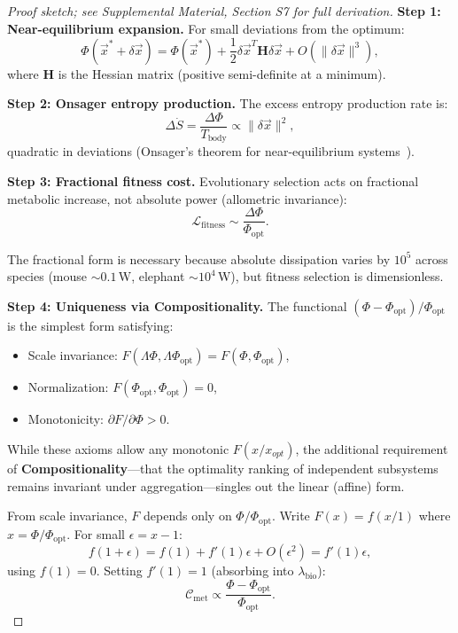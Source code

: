 \begin{proof}[Proof sketch; see Supplemental Material, Section S7 for full derivation]
\textbf{Step 1: Near-equilibrium expansion.} For small deviations from the
optimum:
\begin{equation}
    \Phi(\vec{x}^* + \delta\vec{x})
    = \Phi(\vec{x}^*)
    + \frac{1}{2} \delta\vec{x}^T \mathbf{H} \delta\vec{x} + O(\|\delta\vec{x}\|^3),
\end{equation}
where $\mathbf{H}$ is the Hessian matrix (positive semi-definite at a minimum).

\textbf{Step 2: Onsager entropy production.} The excess entropy production rate
is:
\begin{equation}
    \Delta\dot{S} = \frac{\Delta\Phi}{T_{\mathrm{body}}}
    \propto \|\delta\vec{x}\|^2,
\end{equation}
quadratic in deviations (Onsager's theorem for near-equilibrium
systems~\cite{onsager1931}).

\textbf{Step 3: Fractional fitness cost.} Evolutionary selection acts on
fractional metabolic increase, not absolute power (allometric invariance):
\begin{equation}
    \mathcal{L}_{\mathrm{fitness}}
    \sim \frac{\Delta\Phi}{\Phi_{\mathrm{opt}}}.
\end{equation}

The fractional form is necessary because absolute dissipation varies by $10^{5}$
across species (mouse $\sim 0.1$\,W, elephant $\sim 10^4$\,W), but fitness
selection is dimensionless.

\textbf{Step 4: Uniqueness via Compositionality.} The functional $(\Phi -
\Phi_{\mathrm{opt}})/\Phi_{\mathrm{opt}}$ is the simplest form satisfying:
\begin{itemize}
    \item
Scale invariance: $F(\Lambda\Phi, \Lambda\Phi_{\mathrm{opt}}) = F(\Phi,
\Phi_{\mathrm{opt}})$,
    \item
Normalization: $F(\Phi_{\mathrm{opt}}, \Phi_{\mathrm{opt}}) = 0$,
    \item
Monotonicity: $\partial F/\partial\Phi > 0$.
\end{itemize}
While these axioms allow any monotonic $F(x/x_{opt})$, the additional
requirement of \textbf{Compositionality}---that the optimality ranking of
independent subsystems remains invariant under aggregation---singles out the
linear (affine) form.

From scale invariance, $F$ depends only on $\Phi/\Phi_{\mathrm{opt}}$. Write
$F(x) = f(x/1)$ where $x = \Phi/\Phi_{\mathrm{opt}}$. For small $\epsilon = x -
1$:
\begin{equation}
    f(1 + \epsilon) = f(1) + f'(1)\epsilon + O(\epsilon^2) = f'(1)\epsilon,
\end{equation}
using $f(1) = 0$. Setting $f'(1) = 1$ (absorbing into $\lambda_{\mathrm{bio}}$):
\begin{equation}
    \mathcal{C}_{\mathrm{met}} \propto \frac{\Phi - \Phi_{\mathrm{opt}}}{\Phi_{\mathrm{opt}}}.
\end{equation}
\end{proof}

